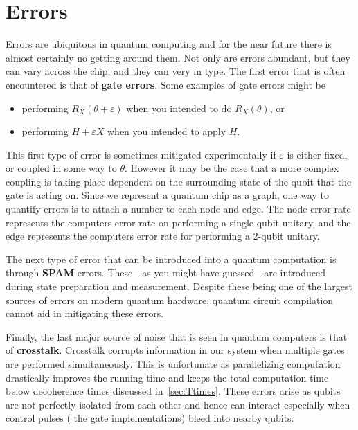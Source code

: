 \section{Errors}

Errors are ubiquitous in quantum computing and for the near future there is almost certainly no getting around them.
Not only are errors abundant, but they can vary across the chip, and they can very in type.
The first error that is often encountered is that of \textbf{gate errors}.
Some examples of gate errors might be
\begin{itemize}
    \item performing $R_X(\theta + \varepsilon)$ when you intended to do $R_X(\theta)$, or
    \item performing $H + \varepsilon X$ when you intended to apply $H$.
\end{itemize}
This first type of error is sometimes mitigated experimentally if $\varepsilon$ is either fixed, or coupled in some way to $\theta$.
However it may be the case that a more complex coupling is taking place dependent on the surrounding state of the qubit that the gate is acting on.
Since we represent a quantum chip as a graph, one way to quantify errors is to attach a number to each node and edge.
The node error rate represents the computers error rate on performing a single qubit unitary, and the edge represents the computers error rate for performing a 2-qubit unitary.

The next type of error that can be introduced into a quantum computation is through \textbf{\ac{SPAM}} errors. %
These---as you might have guessed---are introduced during state preparation and measurement.
Despite these being one of the largest sources of errors on modern quantum hardware, quantum circuit compilation cannot aid in mitigating these errors.

Finally, the last major source of noise that is seen in quantum computers is that of \textbf{crosstalk}.
Crosstalk corrupts information in our system when multiple gates are performed simultaneously.
This is unfortunate as parallelizing computation drastically improves the running time and keeps the total computation time below decoherence times discussed in~\cref{sec:Ttimes}.
These errors arise as qubits are not perfectly isolated from each other and hence can interact especially when control pulses (\ie{} the gate implementations) bleed into nearby qubits.
